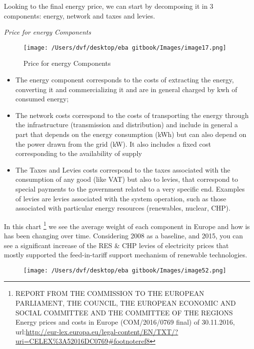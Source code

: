 \documentclass[]{book}
\let\rmarkdownfootnote\footnote%
\def\footnote{\protect\rmarkdownfootnote}
\theoremstyle{definition}
\theoremstyle{definition}
\theoremstyle{definition}
\theoremstyle{remark}
\begin{document}
Looking to the final energy price, we can start by decomposing it in 3
components: energy, network and taxes and levies.

\emph{Price for energy Components}

\begin{figure}[htbp]
\centering
\texttt{[image: /Users/dvf/desktop/eba gitbook/Images/image17.png]}
\caption{Price for energy Components}
\end{figure}

\begin{itemize}
\item
  The energy component corresponds to the costs of extracting the
  energy, converting it and commercializing it and are in general
  charged by kwh of consumed energy;
\item
  The network costs correspond to the costs of transporting the energy
  through the infrastructure (transmission and distribution) and include
  in general a part that depends on the energy consumption (kWh) but can
  also depend on the power drawn from the grid (kW). It also includes a
  fixed cost corresponding to the availability of supply
\item
  The Taxes and Levies costs correspond to the taxes associated with the
  consumption of any good (like VAT) but also to levies, that correspond
  to special payments to the government related to a very specific end.
  Examples of levies are levies associated with the system operation,
  such as those associated with particular energy resources (renewables,
  nuclear, CHP).
\end{itemize}

In this chart \footnote{REPORT FROM THE COMMISSION TO THE EUROPEAN
  PARLIAMENT, THE COUNCIL, THE EUROPEAN ECONOMIC AND SOCIAL COMMITTEE
  AND THE COMMITTEE OF THE REGIONS Energy prices and costs in Europe
  (COM/2016/0769 final) of 30.11.2016,
  url:\url{http://eur-lex.europa.eu/legal-content/EN/TXT/?uri=CELEX\%3A52016DC0769\#footnoteref8}}
we see the average weight of each component in Europe and how is has
been changing over time. Considering 2008 as a baseline, and 2015, you
can see a significant increase of the RES \& CHP levies of electricity
prices that mostly supported the feed-in-tariff support mechanism of
renewable technologies.

\begin{figure}[htbp]
\centering
\texttt{[image: /Users/dvf/desktop/eba gitbook/Images/image52.png]}
\caption{}
\end{figure}
\end{document}
